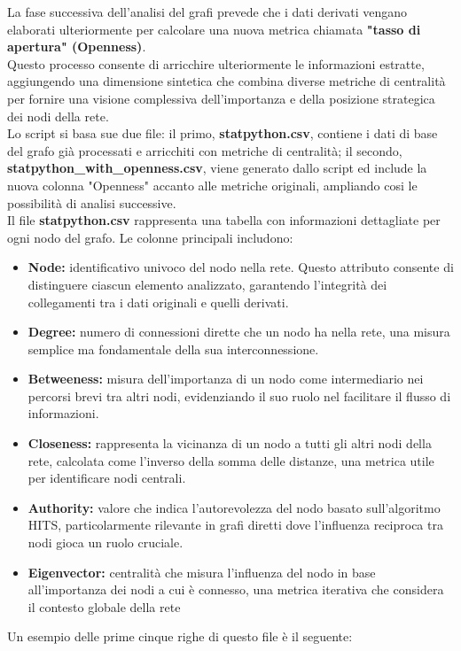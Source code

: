 \documentclass[12pt]{article}
\begin{document}
	La fase successiva dell'analisi del grafi prevede che i dati derivati vengano elaborati ulteriormente per calcolare una nuova metrica chiamata \textbf{"tasso di apertura" (Openness)}.\\
	Questo processo consente di arricchire ulteriormente le informazioni estratte, aggiungendo una dimensione sintetica che combina diverse metriche di centralità per fornire una visione complessiva dell'importanza e della posizione strategica dei nodi della rete.\\
	Lo script si basa sue due file: il primo, \textbf{statpython.csv}, contiene i dati di base del grafo già processati e arricchiti con metriche di centralità; il secondo, \textbf{statpython\_with\_openness.csv}, viene generato dallo script ed include la nuova colonna "Openness" accanto alle metriche originali, ampliando cosi le possibilità di analisi successive.\\
	Il file\textbf{ statpython.csv} rappresenta una tabella con informazioni dettagliate per ogni nodo del grafo. Le colonne principali includono:
	\begin{itemize}[label=] 
		\item \textbf{Node:} identificativo univoco del nodo nella rete. Questo attributo consente di distinguere ciascun elemento analizzato, garantendo l'integrità dei collegamenti tra i dati originali e quelli derivati.
		\item \textbf{Degree:} numero di connessioni dirette che un nodo ha nella rete, una misura semplice ma fondamentale della sua interconnessione.
		\item \textbf{Betweeness:} misura dell'importanza di un nodo come intermediario nei percorsi brevi tra altri nodi, evidenziando il suo ruolo nel facilitare il flusso di informazioni.
		\item \textbf{Closeness:} rappresenta la vicinanza di un nodo a tutti gli altri nodi della rete, calcolata come l'inverso della somma delle distanze, una metrica utile per identificare nodi centrali.
		\item \textbf{Authority:} valore che indica l'autorevolezza del nodo basato sull'algoritmo HITS, particolarmente rilevante in grafi diretti dove l'influenza reciproca tra nodi gioca un ruolo cruciale.
		\item \textbf{Eigenvector:} centralità che misura l'influenza del nodo in base all'importanza dei nodi a cui è connesso, una metrica iterativa che considera il contesto globale della rete
	\end{itemize}
	Un esempio delle prime cinque righe di questo file è il seguente:
\end{document}
